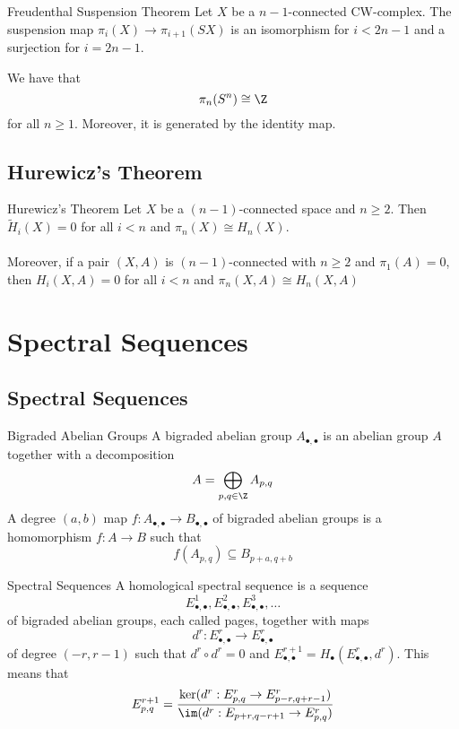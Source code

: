 \documentclass[a4paper]{article}
\begin{document}
\begin{crl}{Freudenthal Suspension Theorem}{} Let $X$ be a $n-1$-connected CW-complex. The suspension map $\pi_i(X)\to\pi_{i+1}(SX)$ is an isomorphism for $i<2n-1$ and a surjection for $i=2n-1$. 
\end{crl}

\begin{crl}{}{} We have that $$\pi_n(S^n)\cong\Z$$ for all $n\geq 1$. Moreover, it is generated by the identity map. 
\end{crl}

\subsection{Hurewicz's Theorem}
\begin{thm}{Hurewicz's Theorem}{} Let $X$ be a $(n-1)$-connected space and $n\geq 2$. Then $\widetilde{H}_i(X)=0$ for all $i<n$ and $\pi_n(X)\cong H_n(X)$. \\~\\

Moreover, if a pair $(X,A)$ is $(n-1)$-connected with $n\geq 2$ and $\pi_1(A)=0$, then $H_i(X,A)=0$ for all $i<n$ and $\pi_n(X,A)\cong H_n(X,A)$
\end{thm}

\pagebreak
\section{Spectral Sequences}
\subsection{Spectral Sequences}
\begin{defn}{Bigraded Abelian Groups}{} A bigraded abelian group $A_{\bullet,\bullet}$ is an abelian group $A$ together with a decomposition $$A=\bigoplus_{p,q\in\Z}A_{p,q}$$ A degree $(a,b)$ map $f:A_{\bullet,\bullet}\to B_{\bullet,\bullet}$ of bigraded abelian groups is a homomorphism $f:A\to B$ such that $$f(A_{p,q})\subseteq B_{p+a,q+b}$$
\end{defn}

\begin{defn}{Spectral Sequences}{} A homological spectral sequence is a sequence $$E_{\bullet,\bullet}^1,E_{\bullet,\bullet}^2,E_{\bullet,\bullet}^3,\dots$$ of bigraded abelian groups, each called pages, together with maps $$d^r:E_{\bullet,\bullet}^r\to E_{\bullet,\bullet}^r$$ of degree $(-r,r-1)$ such that $d^r\circ d^r=0$ and $E_{\bullet,\bullet}^{r+1}=H_\bullet(E_{\bullet,\bullet}^r,d^r)$. This means that $$E_{p,q}^{r+1}=\frac{\ker(d^r:E_{p,q}^r\to E_{p-r,q+r-1}^r)}{\im(d^r:E_{p+r,q-r+1}\to E_{p,q}^r)}$$
\end{defn}
\end{document}
